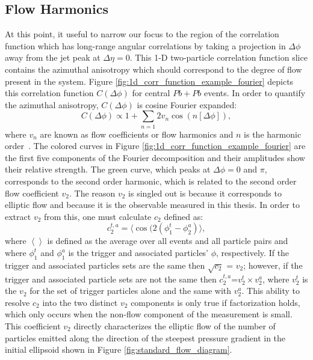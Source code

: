 \subsection{Flow Harmonics}
At this point, it useful to narrow our focus to the region of the correlation function which has long-range angular correlations by taking a projection in $\Delta\phi$ away from the jet peak at $\Delta\eta = 0$. This 1-D two-particle correlation function slice contains the azimuthal anisotropy which should correspond to the degree of flow present in the system. Figure \ref{fig:1d_corr_function_example_fourier} depicts this correlation function $C(\Delta\phi)$ for central $Pb+Pb$ events. In order to quantify the azimuthal anisotropy, $C(\Delta\phi)$ is cosine Fourier expanded:
\begin{equation}\label{eqn:dndphi}
  C(\Delta\phi) \propto 1 + \sum_{n=1}2 v_{n}\cos(n[\Delta\phi]),
\end{equation}
where $v_n$ are known as flow coefficients or flow harmonics and $n$ is the harmonic order~\cite{Voloshin1996}. The colored curves in Figure \ref{fig:1d_corr_function_example_fourier} are the first five components of the Fourier decomposition and their amplitudes show their relative strength. The green curve, which peaks at $\Delta\phi = 0$ and $\pi$, corresponds to the second order harmonic, which is related to the second order flow coefficient $v_2$. The reason $v_2$ is singled out is because it corresponds to elliptic flow and because it is the observable measured in this thesis. In order to extract $v_2$ from this, one must calculate $c_2$ defined as:
\begin{equation}
  c_2^{t,a} = \langle\cos(2(\phi_1^t-\phi_2^a)\rangle,
\end{equation}
where $\left<\right>$ is defined as the average over all events  and all particle pairs and where $\phi_1^t$ and $\phi_1^a$ is the trigger and associated particles' $\phi$, respectively. If the trigger and associated particles sets are the same then $\sqrt{c_2}$ = $v_2$; however, if the trigger and associated particle sets are not the same then $c_2^{t,a} $=$v_2^{t}\times v_2^{a}$, where $v_2^{t}$ is the $v_2$ for the set of trigger particles alone and the same with $v_2^a$. This ability to resolve $c_2$ into the two distinct $v_2$ components is only true if factorization holds, which only occurs when the non-flow component of the measurement is small. This coefficient $v_2$ directly characterizes the elliptic flow of the number of particles emitted along the direction of the steepest pressure gradient in the initial ellipsoid shown in Figure \ref{fig:standard_flow_diagram}.
